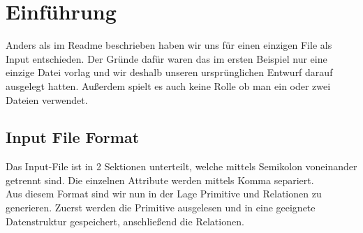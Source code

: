 \chapter{Einführung}
Anders als im Readme beschrieben haben wir uns für einen
einzigen File als Input entschieden. Der Gründe dafür waren
das im ersten Beispiel nur eine einzige Datei vorlag und wir
deshalb unseren ursprünglichen Entwurf darauf ausgelegt hatten.
Außerdem spielt es auch keine Rolle ob man ein oder zwei
Dateien verwendet.\\
\section{Input File Format}
  Das Input-File ist in 2 Sektionen unterteilt, welche mittels
  Semikolon voneinander getrennt sind. Die einzelnen Attribute
  werden mittels Komma separiert.\\
  Aus diesem Format sind wir nun in der Lage Primitive und
  Relationen zu generieren.
  Zuerst werden die Primitive ausgelesen und in eine geeignete
  Datenstruktur gespeichert, anschließend die Relationen.